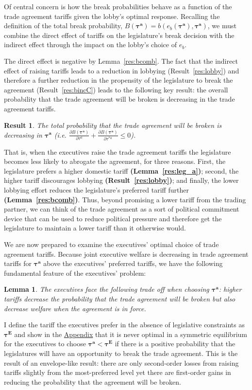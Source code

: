 \documentclass[10pt]{article}
\newtheorem{lemma}{Lemma}
\newtheorem{result}{Result}
\newcommand{\bta}{\bm{\tau^a}}
\begin{document}
Of central concern is how the break probabilities behave as a function of the trade agreement tariffs given the lobby's optimal response. Recalling the definition of the total break probability, $B(\bta)=b(e_b(\bta),\bta)$, we must combine the direct effect of tariffs on the legislature's break decision with the indirect effect through the impact on the lobby's choice of $e_b$.

The direct effect is negative by Lemma~\ref{res:bcomb}. The fact that the indirect effect of raising tariffs leads to a reduction in lobbying (Result~\ref{res:lobby}) and therefore a further reduction in the propensity of the legislature to break the agreement (Result~\ref{res:bincC}) leads to the following key result: the overall probability that the trade agreement will be broken is decreasing in the trade agreement tariffs.
 
\begin{result}
	The total probability that the trade agreement will be broken is decreasing in $\bta$ (i.e. $\frac{\partial B(\bta)}{\partial  \tau^a} + \frac{\partial B(\bta)}{\partial  \tau^{*a}} \leq 0$).
	\label{res:bcomB}
\end{result}

\noindent That is, when the executives raise the trade agreement tariffs the legislature becomes less likely to abrogate the agreement, for three reasons. First, the legislature prefers a higher domestic tariff \textbf{(Lemma~\ref{res:leg_a})}; second, the higher tariff discourages lobbying \textbf{(Result~\ref{res:lobby})}; and finally, the lower lobbying effort reduces the legislature's preferred tariff further \textbf{(Lemma~\ref{res:bcomb})}. Thus, beyond promising a lower tariff from the trading partner, we can think of the trade agreement as a sort of political commitment device that can be used to reduce political pressure and therefore get the legislature to maintain a lower tariff than it otherwise would.

We are now prepared to examine the executives' optimal choice of trade agreement tariffs. Because joint executive welfare is decreasing in trade agreement tariffs for $\bta$ above the executives' preferred tariffs, we have the following fundamental feature of the executives' problem:
\begin{lemma}
  The executives face the following trade off when choosing $\bta$: higher tariffs decrease the probability that the trade agreement will be broken but also decrease welfare when the agreement is in force.
  \label{res:to}
\end{lemma}
I define the tariff the executives prefer in the absence of legislative constraints as $\bm{\tau^E}$ and show in the \hyperlink{int_soln}{Appendix} that it is never optimal in a symmetric equilibrium for the executives to choose $\bm{\tau^a} < \bm{\tau^E}$ if there is a positive probability that the legislatures will have an opportunity to break the trade agreement. This is the result of an envelope-like result: there are only second-order losses from raising tariffs slightly from the most-preferred level yet there are first-order gains in reducing the probability that the agreement will be broken.
\end{document}
